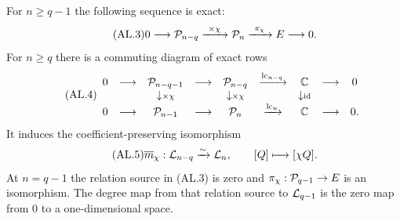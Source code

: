 \begin{proposition}
For $n\ge q-1$ the following sequence is exact:
\begin{equation}\tag{AL.3}
0\longrightarrow\mathcal P_{n-q}\xrightarrow{\ \times\chi\ }
\mathcal P_n\xrightarrow{\ \pi_\chi\ }E\longrightarrow0.
\end{equation}
For $n\ge q$ there is a commuting diagram of exact rows
\begin{equation}\tag{AL.4}
\begin{array}{ccccccccc}
0&\longrightarrow&\mathcal P_{n-q-1}&\longrightarrow&\mathcal P_{n-q}
 &\xrightarrow{\operatorname{lc}_{n-q}}&\mathbb C&\longrightarrow&0\\
 &&\downarrow\scriptstyle\times\chi&&\downarrow\scriptstyle\times\chi
 &&\downarrow\scriptstyle\mathrm{id}&&\\
0&\longrightarrow&\mathcal P_{n-1}&\longrightarrow&\mathcal P_n
 &\xrightarrow{\operatorname{lc}_n}&\mathbb C&\longrightarrow&0.
\end{array}
\end{equation}
It induces the coefficient-preserving isomorphism
\begin{equation}\tag{AL.5}
\overline m_\chi:\mathcal L_{n-q}\xrightarrow{\sim}\mathcal L_n,
\qquad [Q]\longmapsto[\chi Q].
\end{equation}
At $n=q-1$ the relation source in (AL.3) is zero and
$\pi_\chi:\mathcal P_{q-1}\to E$ is an isomorphism. The degree map from that
relation source to $\mathcal L_{q-1}$ is the zero map from $0$ to a
one-dimensional space.
\end{proposition}


